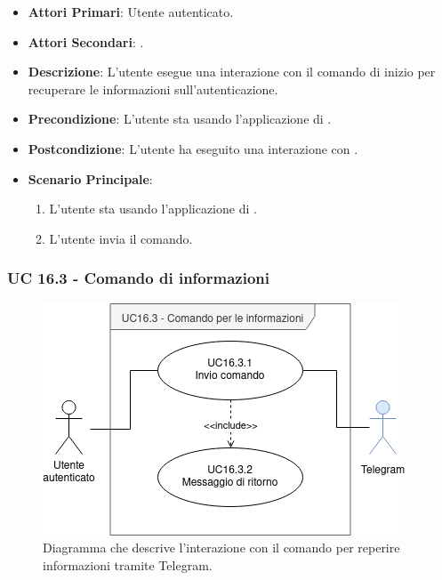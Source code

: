 	\begin{itemize}
		\item \textbf{Attori Primari}: Utente autenticato.
		\item \textbf{Attori Secondari}: .
		\item \textbf{Descrizione}: L'utente esegue una interazione con il comando di inizio per recuperare le informazioni sull'autenticazione.
		\item \textbf{Precondizione}: L'utente sta usando l'applicazione di .
		\item \textbf{Postcondizione}: L'utente ha eseguito una interazione con .
		\item \textbf{Scenario Principale}:
		\begin{enumerate}
			\item L'utente sta usando l'applicazione di . 
			\item L'utente invia il comando.
		\end{enumerate}
	\end{itemize}



	\subsubsection{UC 16.3 - Comando di informazioni}

	\begin{figure}[H]
		\centering
		\includegraphics[scale=0.60]{res/images/uc16.3}
		\caption{Diagramma che descrive l'interazione con il comando per reperire informazioni tramite Telegram.}
	\end{figure}

